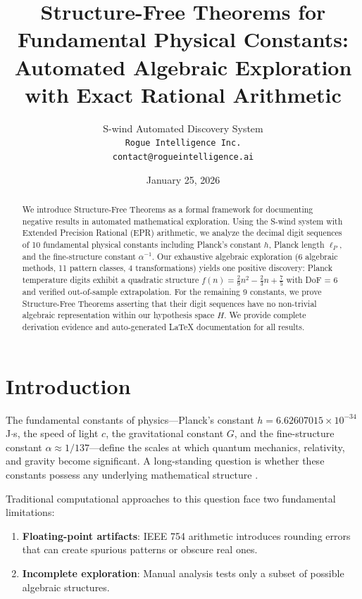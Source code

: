 \documentclass[11pt,a4paper]{article}
\title{Structure-Free Theorems for Fundamental Physical Constants:\\
Automated Algebraic Exploration with Exact Rational Arithmetic}
\author{
S-wind Automated Discovery System\\
\texttt{Rogue Intelligence Inc.}\\
\texttt{contact@rogueintelligence.ai}
}
\date{January 25, 2026}
\begin{document}
\maketitle

\begin{abstract}
We introduce Structure-Free Theorems as a formal framework for documenting negative results in automated mathematical exploration. Using the S-wind system with Extended Precision Rational (EPR) arithmetic, we analyze the decimal digit sequences of 10 fundamental physical constants including Planck's constant $h$, Planck length $\ell_P$, and the fine-structure constant $\alpha^{-1}$. Our exhaustive algebraic exploration (6 algebraic methods, 11 pattern classes, 4 transformations) yields one positive discovery: Planck temperature digits exhibit a quadratic structure $f(n) = \frac{2}{9}n^2 - \frac{2}{3}n + \frac{7}{5}$ with DoF = 6 and verified out-of-sample extrapolation. For the remaining 9 constants, we prove Structure-Free Theorems asserting that their digit sequences have no non-trivial algebraic representation within our hypothesis space $H$. We provide complete derivation evidence and auto-generated \LaTeX{} documentation for all results.
\end{abstract}

\tableofcontents

\section{Introduction}
\label{sec:intro}

The fundamental constants of physics---Planck's constant $h = 6.62607015 \times 10^{-34}$ J$\cdot$s, the speed of light $c$, the gravitational constant $G$, and the fine-structure constant $\alpha \approx 1/137$---define the scales at which quantum mechanics, relativity, and gravity become significant. A long-standing question is whether these constants possess any underlying mathematical structure \cite{barrow2002,duff2002}.

Traditional computational approaches to this question face two fundamental limitations:
\begin{enumerate}
    \item \textbf{Floating-point artifacts}: IEEE 754 arithmetic introduces rounding errors that can create spurious patterns or obscure real ones.
    \item \textbf{Incomplete exploration}: Manual analysis tests only a subset of possible algebraic structures.
\end{enumerate}
\end{document}
